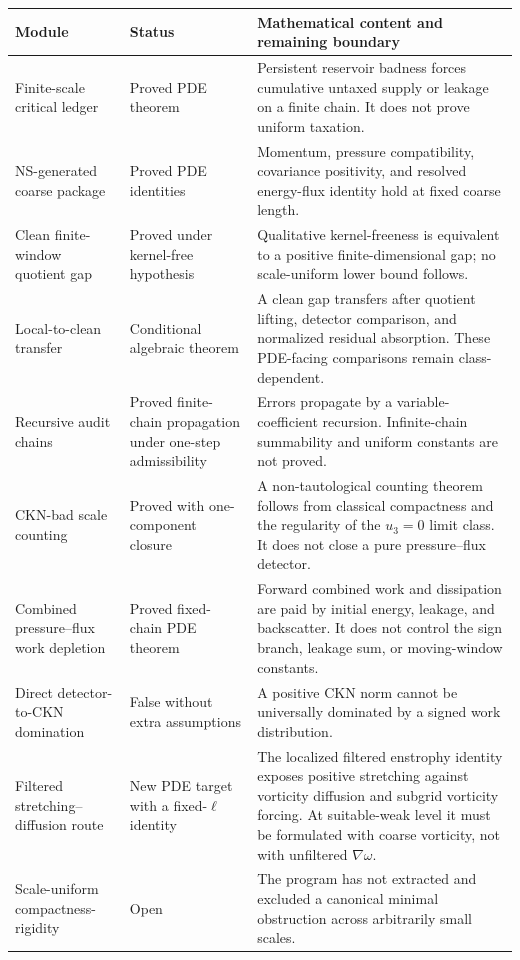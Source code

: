 \documentclass[11pt]{article}
\numberwithin{equation}{section}
\theoremstyle{remark}
\begin{document}
\begin{center}
\small
\begin{tabularx}{\textwidth}{@{}p{}p{}X@{}}
\toprule
Module & Status & Mathematical content and remaining boundary\\
\midrule
Finite-scale critical ledger & Proved PDE theorem & Persistent reservoir badness forces cumulative untaxed supply or leakage on a finite chain. It does not prove uniform taxation.\\
NS-generated coarse package & Proved PDE identities & Momentum, pressure compatibility, covariance positivity, and resolved energy-flux identity hold at fixed coarse length.\\
Clean finite-window quotient gap & Proved under kernel-free hypothesis & Qualitative kernel-freeness is equivalent to a positive finite-dimensional gap; no scale-uniform lower bound follows.\\
Local-to-clean transfer & Conditional algebraic theorem & A clean gap transfers after quotient lifting, detector comparison, and normalized residual absorption. These PDE-facing comparisons remain class-dependent.\\
Recursive audit chains & Proved finite-chain propagation under one-step admissibility & Errors propagate by a variable-coefficient recursion. Infinite-chain summability and uniform constants are not proved.\\
CKN-bad scale counting & Proved with one-component closure & A non-tautological counting theorem follows from classical compactness and the regularity of the $u_3=0$ limit class. It does not close a pure pressure--flux detector.\\
Combined pressure--flux work depletion & Proved fixed-chain PDE theorem & Forward combined work and dissipation are paid by initial energy, leakage, and backscatter. It does not control the sign branch, leakage sum, or moving-window constants.\\
Direct detector-to-CKN domination & False without extra assumptions & A positive CKN norm cannot be universally dominated by a signed work distribution.\\
Filtered stretching--diffusion route & New PDE target with a fixed-$\ell$ identity & The localized filtered enstrophy identity exposes positive stretching against vorticity diffusion and subgrid vorticity forcing. At suitable-weak level it must be formulated with coarse vorticity, not with unfiltered $\nabla\omega$.\\
Scale-uniform compactness-rigidity & Open & The program has not extracted and excluded a canonical minimal obstruction across arbitrarily small scales.\\
\bottomrule
\end{tabularx}
\end{center}
\end{document}
